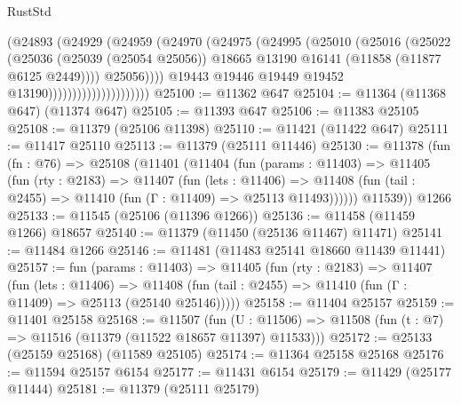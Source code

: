 \begin{lexlean}{RustStd}
\begin{coremodule}
                                      (@24893
                                        (@24929
                                          (@24959
                                            (@24970
                                              (@24975
                                                (@24995
                                                  (@25010
                                                    (@25016
                                                      (@25022
                                                        (@25036
                                                          (@25039 (@25054 @25056))
                                                          @18665
                                                          @13190
                                                          @16141
                                                          (@11858 (@11877 @6125 @2449))))
                                                      @25056))))
                                              @19443
                                              @19446
                                              @19449
                                              @19452
                                              @13190)))))))))))))))))))))
@25100 := @11362 @647
@25104 := @11364 (@11368 @647) (@11374 @647)
@25105 := @11393 @647
@25106 := @11383 @25105
@25108 := @11379 (@25106 @11398)
@25110 := @11421 (@11422 @647)
@25111 := @11417 @25110
@25113 := @11379 (@25111 @11446)
@25130 := @11378
    (fun (fn : @76) =>
    @25108
      (@11401
        (@11404
          (fun (params : @11403) =>
          @11405
            (fun (rty : @2183) =>
            @11407
              (fun (lets : @11406) =>
              @11408 (fun (tail : @2455) => @11410 (fun (Γ : @11409) => @25113 @11493))))))
        @11539))
    @1266
@25133 := @11545 (@25106 (@11396 @1266))
@25136 := @11458 (@11459 @1266) @18657
@25140 := @11379 (@11450 (@25136 @11467) @11471)
@25141 := @11484 @1266
@25146 := @11481 (@11483 @25141 @18660 @11439 @11441)
@25157 := fun (params : @11403) =>
  @11405
    (fun (rty : @2183) =>
    @11407
      (fun (lets : @11406) =>
      @11408 (fun (tail : @2455) => @11410 (fun (Γ : @11409) => @25113 (@25140 @25146)))))
@25158 := @11404 @25157
@25159 := @11401 @25158
@25168 := @11507
    (fun (U : @11506) => @11508 (fun (t : @7) => @11516 (@11379 (@11522 @18657 @11397) @11533)))
@25172 := @25133 (@25159 @25168) (@11589 @25105)
@25174 := @11364 @25158 @25168
@25176 := @11594 @25157 @6154
@25177 := @11431 @6154
@25179 := @11429 (@25177 @11444)
@25181 := @11379 (@25111 @25179)

\end{coremodule}
\end{lexlean}
